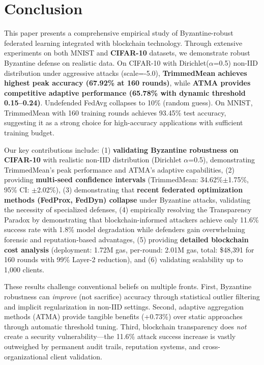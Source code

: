 \documentclass{ieeeaccess}
\begin{document}
\section{Conclusion}
\label{sec:conclusion}

This paper presents a comprehensive empirical study of Byzantine-robust federated learning integrated with blockchain technology. Through extensive experiments on both MNIST and \textbf{CIFAR-10} datasets, we demonstrate robust Byzantine defense on realistic data. On CIFAR-10 with Dirichlet($\alpha$=0.5) non-IID distribution under aggressive attacks (scale=-5.0), \textbf{TrimmedMean achieves highest peak accuracy (67.92\% at 160 rounds)}, while \textbf{ATMA provides competitive adaptive performance (65.78\% with dynamic threshold 0.15--0.24)}. Undefended FedAvg collapses to 10\% (random guess). On MNIST, TrimmedMean with 160 training rounds achieves 93.45\% test accuracy, suggesting it as a strong choice for high-accuracy applications with sufficient training budget.

Our key contributions include: (1) \textbf{validating Byzantine robustness on CIFAR-10} with realistic non-IID distribution (Dirichlet $\alpha$=0.5), demonstrating TrimmedMean's peak performance and ATMA's adaptive capabilities, (2) providing \textbf{multi-seed confidence intervals} (TrimmedMean: 34.62\%$\pm$1.75\%, 95\% CI: $\pm$2.02\%), (3) demonstrating that \textbf{recent federated optimization methods (FedProx, FedDyn) collapse} under Byzantine attacks, validating the necessity of specialized defenses, (4) empirically resolving the Transparency Paradox by demonstrating that blockchain-informed attackers achieve only 11.6\% success rate with 1.8\% model degradation while defenders gain overwhelming forensic and reputation-based advantages, (5) providing \textbf{detailed blockchain cost analysis} (deployment: 1.72M gas, per-round: 2.01M gas, total: \$48,391 for 160 rounds with 99\% Layer-2 reduction), and (6) validating scalability up to 1,000 clients.

These results challenge conventional beliefs on multiple fronts. First, Byzantine robustness can \emph{improve} (not sacrifice) accuracy through statistical outlier filtering and implicit regularization in non-IID settings. Second, adaptive aggregation methods (ATMA) provide tangible benefits (+0.73\%) over static approaches through automatic threshold tuning. Third, blockchain transparency does \emph{not} create a security vulnerability---the 11.6\% attack success increase is vastly outweighed by permanent audit trails, reputation systems, and cross-organizational client validation.
\end{document}
